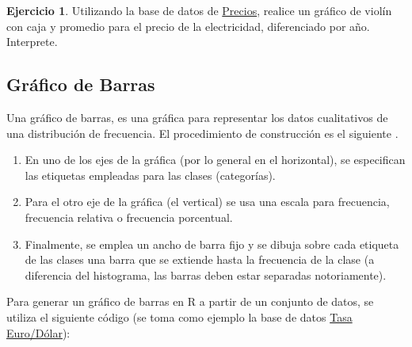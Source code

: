 \documentclass[
  11pt,
]{book}
\providecommand{\tightlist}{%
  \setlength{\itemsep}{0pt}\setlength{\parskip}{0pt}}
\theoremstyle{definition}
\theoremstyle{definition}
\theoremstyle{definition}
\newtheorem{exercise}{Ejercicio}[chapter]
\theoremstyle{definition}
\theoremstyle{remark}
\begin{document}
\begin{exercise}
Utilizando la base de datos de \hyperref[PreciosElectricidad]{Precios}, realice un gráfico de violín con caja y promedio para el precio de la electricidad, diferenciado por año. Interprete.
\end{exercise}

\subsection{Gráfico de Barras}\label{gruxe1fico-de-barras}

Una gráfico de barras, es una gráfica para representar los datos cualitativos de una distribución de frecuencia. El procedimiento de construcción es el siguiente \citep[página 29]{anderson}.

\begin{enumerate}
\def\labelenumi{\arabic{enumi}.}
\tightlist
\item
  En uno de los ejes de la gráfica (por lo general en el horizontal), se especifican las etiquetas empleadas para las clases (categorías).
\item
  Para el otro eje de la gráfica (el vertical) se usa una escala para frecuencia, frecuencia relativa o frecuencia porcentual.
\item
  Finalmente, se emplea un ancho de barra fijo y se dibuja sobre cada etiqueta de las clases una barra que se extiende hasta la frecuencia de la clase (a diferencia del histograma, las barras deben estar separadas notoriamente).
\end{enumerate}

Para generar un gráfico de barras en R a partir de un conjunto de datos, se utiliza el siguiente código (se toma como ejemplo la base de datos \hyperref[TasaEURUSD]{Tasa Euro/Dólar}):
\end{document}
